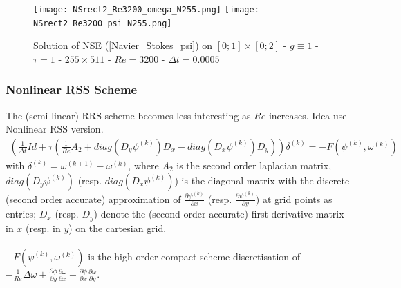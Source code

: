 \documentclass[hyperref={pdfpagemode=FullScreen},9pt]{beamer}
\newcommand{\Frac}[2] {\frac{\textstyle #1} {\textstyle #2}}
\begin{document}
%
\begin{frame}
\begin{figure}[!h]
\begin{center}
\texttt{[image: NSrect2\_Re3200\_omega\_N255.png]}
\texttt{[image: NSrect2\_Re3200\_psi\_N255.png]}
\vskip -0.5cm
\caption{Solution of NSE (\ref{Navier_Stokes_psi}) on $[0; 1] \times [0; 2]$ - $g \equiv 1$ - $\tau = 1$ -  $255 \times 511$ - $Re = 3200$ - $\Delta t = 0.0005$}
\label{NSrect_Re3200}
\end{center}
\end{figure}
\end{frame}
%
\begin{frame}
\frametitle{Nonlinear RSS Scheme}
The (semi linear) RRS-scheme becomes less interesting as $Re$ increases. Idea use Nonlinear RSS version.
\begin{eqnarray}
\left(\Frac{1}{\Delta t}Id+\tau\left(\Frac{1}{Re}A_2+diag(D_y\psi^{(k)}) D_x -diag(D_x\psi^{(k)})D_y\right)\right)\delta^{(k)}=-F(\psi^{(k)},\omega^{(k)})
\end{eqnarray}
with $\delta^{(k)}=\omega^{(k+1)}-\omega^{(k)}$, 
where $A_2$ is the second order laplacian matrix, $diag(D_y\psi^{(k)})$ (resp. $diag(D_x\psi^{(k)})$) is the
diagonal matrix with the discrete (second order accurate) approximation of $\Frac{\partial \psi^{(k)}}{\partial x}$
(resp.  $\Frac{\partial \psi^{(k)}}{\partial y}$) at grid points as entries; $D_x$ (resp. $D_y$) denote the (second order accurate) first derivative matrix in $x$ (resp. in $y$) on the cartesian grid. \\
\\
$-F(\psi^{(k)},\omega^{(k)})$ is the high order compact scheme discretisation of $-\Frac {1}{Re}\Delta \omega
 +\Frac {\partial \phi}{\partial y}
\Frac {\partial \omega}{\partial x} - \Frac {\partial \phi}{\partial
x}
\Frac {\partial \omega}{\partial y}$.

\end{frame}
%
\end{document}
